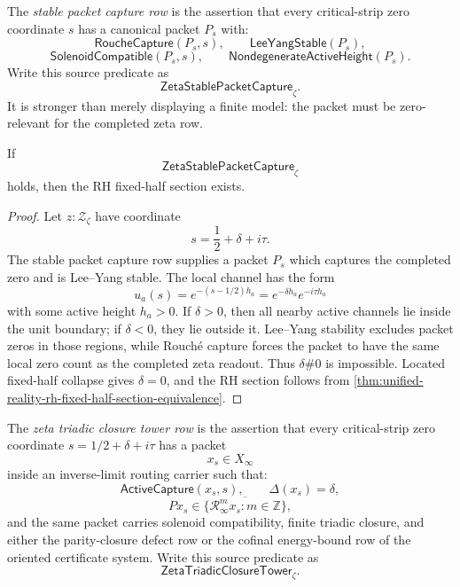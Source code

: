 \begin{definition}
\label{def:unified-reality-stable-packet-capture-row}
The \emph{stable packet capture row} is the assertion that every
critical-strip zero coordinate $s$ has a canonical packet $P_s$ with:
$$
\mathsf{RoucheCapture}(P_s,s),
\qquad
\mathsf{LeeYangStable}(P_s),
$$
$$
\mathsf{SolenoidCompatible}(P_s,s),
\qquad
\mathsf{NondegenerateActiveHeight}(P_s).
$$
Write this source predicate as
$$
\mathsf{ZetaStablePacketCapture}_{\zeta}.
$$
It is stronger than merely displaying a finite model: the packet must be
zero-relevant for the completed zeta row.
\end{definition}

\begin{theorem}
\label{thm:unified-reality-stable-packet-capture-conditionally-sufficient}
If
$$
\mathsf{ZetaStablePacketCapture}_{\zeta}
$$
holds, then the RH fixed-half section exists.
\end{theorem}

\begin{proof}
Let $z:\mathcal Z_{\zeta}$ have coordinate
$$
s=\frac12+\delta+i\tau.
$$
The stable packet capture row supplies a packet $P_s$ which captures the
completed zero and is Lee--Yang stable.  The local channel has the form
$$
u_a(s)=e^{-(s-1/2)h_a}
=
e^{-\delta h_a}e^{-i\tau h_a}
$$
with some active height $h_a>0$.  If $\delta>0$, then all nearby active
channels lie inside the unit boundary; if $\delta<0$, they lie outside
it.  Lee--Yang stability excludes packet zeros in those regions, while
Rouch\'e capture forces the packet to have the same local zero count as
the completed zeta readout.  Thus $\delta\#0$ is impossible.  Located
fixed-half collapse gives $\delta=0$, and the RH section follows from
\autoref{thm:unified-reality-rh-fixed-half-section-equivalence}.
\end{proof}

\begin{definition}
\label{def:unified-reality-zeta-triadic-closure-tower-row}
The \emph{zeta triadic closure tower row} is the assertion that every
critical-strip zero coordinate $s=1/2+\delta+i\tau$ has a packet
$$
x_s\in X_\infty
$$
inside an inverse-limit routing carrier such that:
$$
\mathsf{ActiveCapture}(x_s,s),
\qquad
\Delta(x_s)=\delta,
$$
$$
P x_s\in\overline{\{\mathcal R_\infty^m x_s:m\in\mathbb Z\}},
$$
and the same packet carries solenoid compatibility, finite triadic
closure, and either the parity-closure defect row or the cofinal
energy-bound row of the oriented certificate system.
Write this source predicate as
$$
\mathsf{ZetaTriadicClosureTower}_{\zeta}.
$$
\end{definition}

